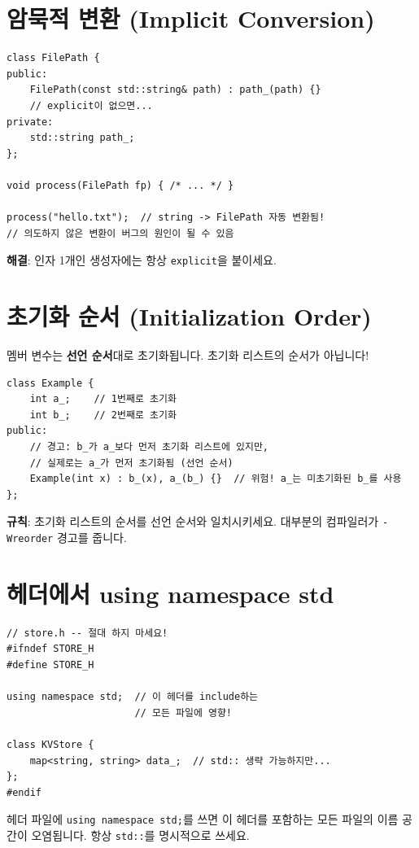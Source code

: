 \documentclass[11pt,a4paper]{book}
\newcommand{\code}[1]{\texttt{#1}}
\begin{document}
\section{암묵적 변환 (Implicit Conversion)}

\begin{lstlisting}[style=cpp]
class FilePath {
public:
    FilePath(const std::string& path) : path_(path) {}
    // explicit이 없으면...
private:
    std::string path_;
};

void process(FilePath fp) { /* ... */ }

process("hello.txt");  // string -> FilePath 자동 변환됨!
// 의도하지 않은 변환이 버그의 원인이 될 수 있음
\end{lstlisting}

\textbf{해결}: 인자 1개인 생성자에는 항상 \code{explicit}을 붙이세요.

\section{초기화 순서 (Initialization Order)}

멤버 변수는 \textbf{선언 순서}대로 초기화됩니다. 초기화 리스트의 순서가 아닙니다!

\begin{lstlisting}[style=cpp]
class Example {
    int a_;    // 1번째로 초기화
    int b_;    // 2번째로 초기화
public:
    // 경고: b_가 a_보다 먼저 초기화 리스트에 있지만,
    // 실제로는 a_가 먼저 초기화됨 (선언 순서)
    Example(int x) : b_(x), a_(b_) {}  // 위험! a_는 미초기화된 b_를 사용
};
\end{lstlisting}

\begin{warningbox}
\textbf{규칙}: 초기화 리스트의 순서를 선언 순서와 일치시키세요. 대부분의 컴파일러가 \code{-Wreorder} 경고를 줍니다.
\end{warningbox}

\section{헤더에서 using namespace std}

\begin{lstlisting}[style=cpp]
// store.h -- 절대 하지 마세요!
#ifndef STORE_H
#define STORE_H

using namespace std;  // 이 헤더를 include하는
                      // 모든 파일에 영향!

class KVStore {
    map<string, string> data_;  // std:: 생략 가능하지만...
};
#endif
\end{lstlisting}

\begin{warningbox}
헤더 파일에 \code{using namespace std;}를 쓰면 이 헤더를 포함하는 모든 파일의 이름 공간이 오염됩니다. 항상 \code{std::}를 명시적으로 쓰세요.
\end{warningbox}

\end{document}
